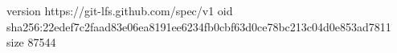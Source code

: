 version https://git-lfs.github.com/spec/v1
oid sha256:22edef7c2faad83e06ea8191ee6234fb0cbf63d0ce78bc213c04d0e853ad7811
size 87544
